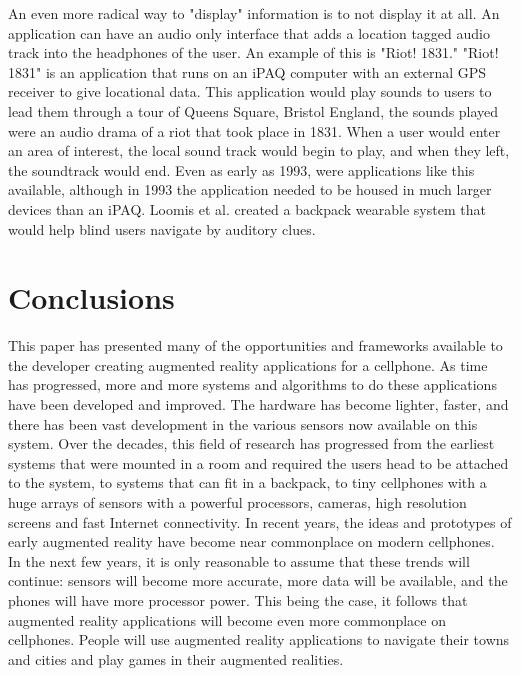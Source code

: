 \documentclass{acm_proc_article-sp}
\begin{document}
An even more radical way to "display" information is to not display it at all.  An application can have an audio only interface that adds a location tagged audio track into the headphones of the user.  An example of this is "Riot! 1831." "Riot! 1831" is an application that runs on an iPAQ computer with an external GPS receiver to give locational data. This application would play sounds to users to lead them through a tour of Queens Square, Bristol England, the sounds played were an audio drama of a riot that took place in 1831.  When a user would enter an area of interest, the local sound track would begin to play, and when they left, the soundtrack would end. \cite{reid2004riot} \cite{reid2005parallel}   Even as early as 1993, were applications like this available, although in 1993 the application needed to be housed in much larger devices than an iPAQ.  Loomis et al. created a backpack wearable system that would help blind users navigate by auditory clues. \cite{loomis1994personal}

\section{Conclusions}
This paper has presented many of the opportunities and frameworks available to the developer creating augmented reality applications for a cellphone.  As time has progressed, more and more systems and algorithms to do these applications have been developed and improved.  The hardware has become lighter, faster, and there has been vast development in the various sensors now available on this system.  Over the decades, this field of research has progressed from the earliest systems that were mounted in a room and required the users head to be attached to the system, to systems that can fit in a backpack, to tiny cellphones with a huge arrays of sensors with a powerful processors, cameras, high resolution screens and fast Internet connectivity. In recent years, the ideas and prototypes of early augmented reality have become near commonplace on modern cellphones.  In the next few years, it is only reasonable to assume that these trends will continue: sensors will become more accurate, more data will be available, and the phones will have more processor power.  This being the case, it follows that augmented reality applications will become even more commonplace on cellphones.  People will use augmented reality applications to navigate their towns and cities and play games in their augmented realities. 



\end{document}
